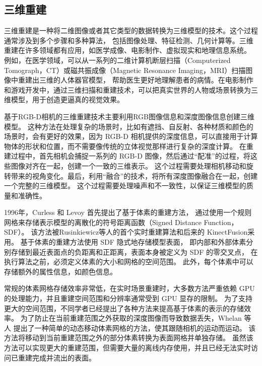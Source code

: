 \subsection{三维重建}

\par 三维重建是一种将二维图像或者其它类型的数据转换为三维模型的技术。这个过程通常涉及到多个步骤和多种算法，
包括图像处理、特征检测、几何计算等。三维重建在许多领域都有应用，如医学成像、电影制作、虚拟现实和地理信息系统。
例如，在医学领域，可以从一系列的二维计算机断层扫描（Computerized Tomograph，CT）或磁共振成像（Magnetic Resonance Imaging，MRI）扫描图像中重建出三维的人体器官模型，
帮助医生更好地理解患者的病情。\cite{bushong2003magnetic,song2017review}在电影制作和游戏开发中，通过三维扫描和重建技术，可以把真实世界的人物或场景转换为三维模型，用于创造更逼真的视觉效果\cite{SLAMCast,hasenfratz2003survey,finance2015visual}。

\par 基于RGB-D相机的三维重建技术主要利用RGB图像信息和深度图像信息创建三维模型。
这种方法在处理复杂的场景时，比如有遮挡、自反射、各种材质和颜色的场景时，会有更好的效果\cite{SLAMCast,cavallari2019real,Dynamicfusion,Fusion4d}，因为 RGB-D 相机提供的深度信息，可以直接用于计算物体的形状和位置，而不需要像传统的立体视觉那样进行复杂的深度计算。
在重建过程中，首先相机会捕捉一系列的 RGB-D 图像，然后通过“配准”的过程，将这些图像对齐在一起，创建一个一致的三维表示。
这个过程需要处理相机移动和旋转带来的视角变化。最后，利用“融合”的技术，将所有深度图像融合在一起，创建一个完整的三维模型。
这个过程需要处理噪声和不一致性，以保证三维模型的质量和准确性。


\par 1996年，Curless 和 Levoy 首先提出了基于体素的重建方法\cite{VolumetricMethod}，
通过使用一个规则网格来存储表示模型的离散化的符号距离函数（Signed Distance Function，SDF）。
该方法被Rusinkiewicz等人的首个实时重建算法\cite{rusinkiewicz2002real}和后来的
KinectFusion\cite{newcombe2011kinectfusion,izadi2011kinectfusion}采用。
基于体素的重建方法使用 SDF 隐式地存储模型表面，
即内部和外部体素分别存储到最近表面点的负距离和正距离，表面本身被定义为 SDF 的零交叉点，
在执行算法之前，必须定义体素的大小和网格的空间范围。
此外，每个体素中可以存储额外的属性信息，如颜色信息。

\par 常规的体素网格存储效率非常低，在实时场景重建时，大多数方法严重依赖 GPU 的处理能力，并且重建空间范围和分辨率通常受到 GPU 显存的限制。
为了支持更大的空间范围，不同学者已经提出了各种方法来提高基于体素的表示的存储效率\cite{whelan2016elasticfusion,vicini2021non,hornung2013octomap}。
为了防止在当前重建范围之外获取的深度图像而导致数据丢失，Whelan 等人
提出了一种简单的动态移动体素网格的方法\cite{whelan2012kintinuous}，使其跟随相机的运动而运动。
该方法将移动到当前重建范围之外的部分体素转换为表面网格并单独存储。
虽然该方法可以实现更大的重建范围，但需要大量的离线内存使用，并且已经无法实时访问已重建完成并流出的表面。